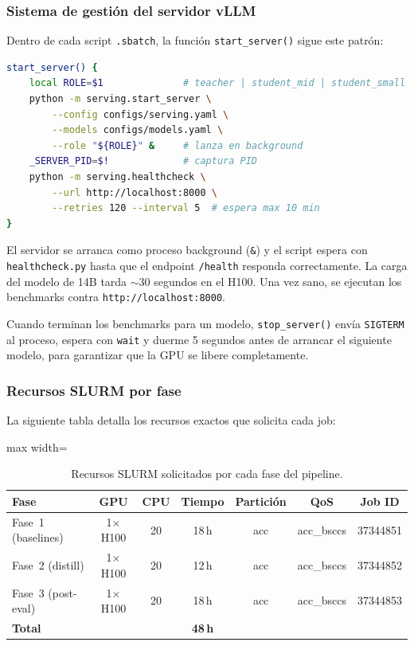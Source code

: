 \documentclass[11pt,a4paper]{article}
\begin{document}
\subsubsection{Sistema de gesti\'on del servidor vLLM}

Dentro de cada script \texttt{.sbatch}, la funci\'on
\texttt{start\_server()} sigue este patr\'on:

\begin{lstlisting}[language=bash, caption={Patr\'on de arranque del
servidor vLLM dentro de cada sbatch.}]
start_server() {
    local ROLE=$1              # teacher | student_mid | student_small
    python -m serving.start_server \
        --config configs/serving.yaml \
        --models configs/models.yaml \
        --role "${ROLE}" &     # lanza en background
    _SERVER_PID=$!             # captura PID
    python -m serving.healthcheck \
        --url http://localhost:8000 \
        --retries 120 --interval 5  # espera max 10 min
}
\end{lstlisting}

El servidor se arranca como proceso background (\texttt{\&}) y el
script espera con \texttt{healthcheck.py} hasta que el endpoint
\texttt{/health} responda correctamente. La carga del modelo de 14B
tarda $\sim$30 segundos en el H100. Una vez sano, se ejecutan los
benchmarks contra \texttt{http://localhost:8000}.

Cuando terminan los benchmarks para un modelo, \texttt{stop\_server()}
env\'ia \texttt{SIGTERM} al proceso, espera con \texttt{wait} y
duerme 5 segundos antes de arrancar el siguiente modelo, para
garantizar que la GPU se libere completamente.

\subsubsection{Recursos SLURM por fase}

La siguiente tabla detalla los recursos exactos que solicita cada job:

\begin{table}[H]
\centering
\caption{Recursos SLURM solicitados por cada fase del pipeline.}
\label{tab:slurm-resources}
\begin{adjustbox}{max width=\textwidth}
\begin{tabular}{@{}lcccccc@{}}
\toprule
\textbf{Fase} & \textbf{GPU} & \textbf{CPU} & \textbf{Tiempo}
  & \textbf{Partici\'on} & \textbf{QoS} & \textbf{Job ID} \\
\midrule
Fase~1 (baselines)  & 1$\times$H100 & 20 & 18\,h & acc & acc\_bsccs & 37344851 \\
Fase~2 (distill)    & 1$\times$H100 & 20 & 12\,h & acc & acc\_bsccs & 37344852 \\
Fase~3 (post-eval)  & 1$\times$H100 & 20 & 18\,h & acc & acc\_bsccs & 37344853 \\
\midrule
\textbf{Total}      & & & \textbf{48\,h} & & & \\
\bottomrule
\end{tabular}
\end{adjustbox}
\end{table}
\end{document}
